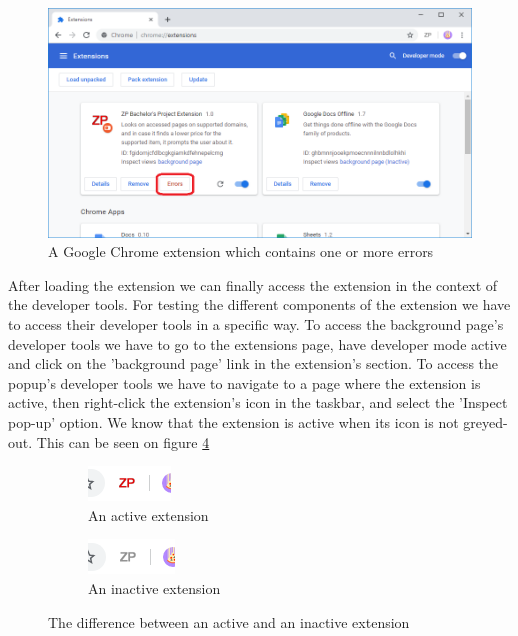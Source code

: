 \documentclass[12pt,a4paper,twoside]{report}
\begin{document}
\begin{figure}[ht]
  \centering
  \includegraphics[width=\linewidth]{img/extension_error.png}
  \caption[]{A Google Chrome extension which contains one or more errors}
  \label{fig:extension_error}
\end{figure}

After loading the extension we can finally access the extension in the context of the developer tools. For testing the different components of the extension we have to access their developer tools in a specific way. To access the background page's developer tools we have to go to the extensions page, have developer mode active and click on the 'background page' link in the extension's section. To access the popup's developer tools we have to navigate to a page where the extension is active, then right-click the extension's icon in the taskbar, and select the 'Inspect pop-up' option. We know that the extension is active when its icon is not greyed-out. This can be seen on figure \ref{mfig:active_and_inactive_extension}

\begin{figure}[ht]
  \centering
  \begin{subfigure}{0.4\textwidth}
    \centering
    \includegraphics[width=0.5\linewidth]{img/active_extension_icon.png}
    \caption[]{An active extension}
    \label{fig:active_extension}
  \end{subfigure}
  \begin{subfigure}{0.4\textwidth}
    \centering
    \includegraphics[width=0.5\linewidth]{img/inactive_extension_icon.png}
    \caption[]{An inactive extension}
    \label{fig:inactive_extension}
  \end{subfigure}
  \caption{The difference between an active and an inactive extension}
  \label{mfig:active_and_inactive_extension}
\end{figure}
\end{document}
